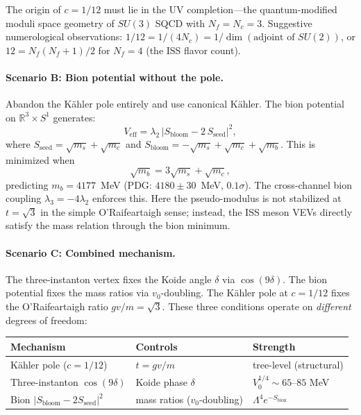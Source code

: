 The origin of $c = 1/12$ must lie in the UV completion---the quantum-modified
moduli space geometry of $SU(3)$ SQCD with $N_f = N_c = 3$.
Suggestive numerological observations:
$1/12 = 1/(4N_c) = 1/\dim(\text{adjoint of }SU(2))$,
or $12 = N_f(N_f+1)/2$ for $N_f = 4$ (the ISS flavor count).

\paragraph{Scenario B: Bion potential without the pole.}
Abandon the K\"ahler pole entirely and use canonical K\"ahler.
The bion potential on $\mathbb{R}^3 \times S^1$ generates:
\begin{equation}
V_{\text{eff}} = \lambda_2\,|S_{\text{bloom}} - 2\,S_{\text{seed}}|^2,
\end{equation}
where $S_{\text{seed}} = \sqrt{m_s} + \sqrt{m_c}$ and
$S_{\text{bloom}} = -\sqrt{m_s} + \sqrt{m_c} + \sqrt{m_b}$.
This is minimized when
\begin{equation}
\sqrt{m_b} = 3\sqrt{m_s} + \sqrt{m_c},
\end{equation}
predicting $m_b = 4177$~MeV (PDG: $4180 \pm 30$~MeV, $0.1\sigma$).
The cross-channel bion coupling $\lambda_3 = -4\lambda_2$ enforces this.
Here the pseudo-modulus is not stabilized at $t = \sqrt{3}$ in the simple
O'Raifeartaigh sense; instead, the ISS meson VEVs directly satisfy the
mass relation through the bion minimum.

\paragraph{Scenario C: Combined mechanism.}
The three-instanton vertex fixes the Koide angle $\delta$ via $\cos(9\delta)$.
The bion potential fixes the mass ratios via $v_0$-doubling.
The K\"ahler pole at $c = 1/12$ fixes the O'Raifeartaigh ratio $gv/m = \sqrt{3}$.
These three conditions operate on \emph{different} degrees of freedom:
\begin{center}
\begin{tabular}{lll}
\textbf{Mechanism} & \textbf{Controls} & \textbf{Strength} \\
\hline
K\"ahler pole ($c = 1/12$) & $t = gv/m$ & tree-level (structural) \\
Three-instanton $\cos(9\delta)$ & Koide phase $\delta$ & $V_0^{1/4} \sim 65$--$85$ MeV \\
Bion $|S_{\text{bloom}} - 2S_{\text{seed}}|^2$ & mass ratios ($v_0$-doubling) & $\Lambda^4 e^{-S_{\text{bion}}}$
\end{tabular}
\end{center}

